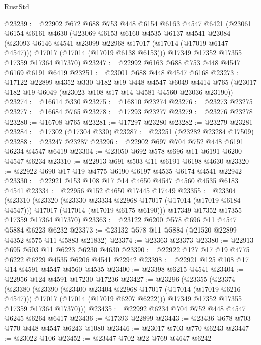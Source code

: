 \begin{lexlean}{RustStd}
\begin{coremodule}
@23239 := @22902
    @672
    @688
    @753
    @448
    @6154
    @6163
    @4547
    @6421
    (@23061
      @6154
      @6161
      @4630
      (@23069
        @6153
        @6160
        @4535
        @6137
        @4541
        @23084
        (@23093 @6146 @4541 @23099 @22968 @17017 (@17014 (@17019 @6147 @4547)))
        @17017
        (@17014 (@17019 @6138 @6153)))
      @17349
      @17352
      @17355
      @17359
      @17364
      @17370)
@23247 := @22992 @6163 @688 @753 @448 @4547 @6169 @6191 @6419
@23251 := @23001 @688 @448 @4547 @6168
@23273 := @17122
    @22899
    @4352
    @330
    @182
    @19
    @448
    @4547
    @6049
    @4414
    @765
    (@23017 @182 @19 @6049 (@23023 @108 @17 @14 @4581 @4560 @23036 @23190))
@23274 := @16614 @330
@23275 := @16810 @23274
@23276 := @23273 @23275
@23277 := @16684 @765
@23278 := @17293 @23277
@23279 := @23276 @23278
@23280 := @16708 @765
@23281 := @17297 @23280
@23282 := @23279 @23281
@23284 := @17302 (@17304 @330)
@23287 := @23251 (@23282 @23284 @17509)
@23288 := @23247 @23287
@23296 := @22902 @697 @704 @752 @448 @6191 @6234 @4547 @6419
@23304 := @23050 @692 @578 @696 @11 @6191 @6200 @4547 @6234
@23310 := @22913 @691 @503 @11 @6191 @6198 @4630
@23320 := @22922 @690 @17 @19 @4775 @6190 @6197 @4535 @6174 @4541 @22942
@23330 := @22921 @153 @108 @17 @14 @4650 @4547 @4560 @4535 @6183 @4541
@23334 := @22956 @152 @4650 @17445 @17449
@23355 := @23304
    (@23310
      (@23320
        (@23330 @23334 @22968 @17017 (@17014 (@17019 @6184 @4547)))
        @17017
        (@17014 (@17019 @6175 @6190)))
      @17349
      @17352
      @17355
      @17359
      @17364
      @17370)
@23363 := @23122 @6200 @578 @696 @11 @4547 @5884 @6223 @6232
@23373 := @23132 @578 @11 @5884 (@21520 @22899 @4352 @575 @11 @5883 @21832)
@23374 := @23363 @23373
@23380 := @22913 @695 @503 @11 @6223 @6230 @4630
@23390 := @22922 @127 @17 @19 @4775 @6222 @6229 @4535 @6206 @4541 @22942
@23398 := @22921 @125 @108 @17 @14 @4591 @4547 @4560 @4535
@23400 := @23398 @6215 @4541
@23404 := @22956 @124 @4591 @17230 @17236
@23427 := @23296
    (@23355
      (@23374
        (@23380
          (@23390
            (@23400 @23404 @22968 @17017 (@17014 (@17019 @6216 @4547)))
            @17017
            (@17014 (@17019 @6207 @6222)))
          @17349
          @17352
          @17355
          @17359
          @17364
          @17370)))
@23435 := @22992 @6234 @704 @752 @448 @4547 @6245 @6264 @6417
@23436 := @17393 @22899
@23443 := @23436 @678 @703 @770 @448 @4547 @6243 @1080
@23446 := @23017 @703 @770 @6243
@23447 := @23022 @106
@23452 := @23447 @702 @22 @769 @4647 @6242

\end{coremodule}
\end{lexlean}
